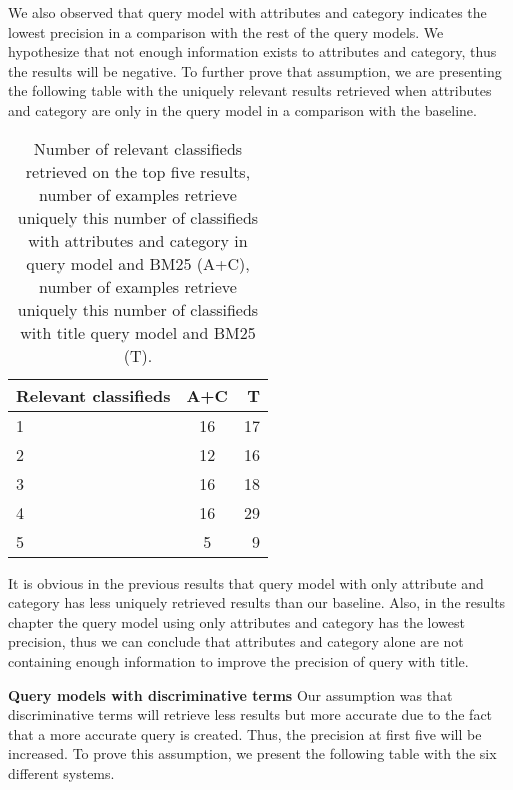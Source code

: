 We also observed that query model with attributes and category indicates the lowest precision in a comparison with the rest of the query models. We hypothesize that not enough information exists to attributes and category, thus the results will be negative. To further prove that assumption, we are presenting the following table with the uniquely relevant results retrieved when attributes and category are only in the query model in a comparison with the baseline.


\begin{table}[h]
\begin{center}
\caption{Number of relevant classifieds retrieved on the top five results, number of examples retrieve uniquely this number of classifieds with attributes and category in query model and BM25 (A+C), number of examples retrieve uniquely this number of classifieds with title query model and BM25 (T).}
\begin{tabular}{lcr}
\midrule
Relevant classifieds &  A+C & T \\
\midrule
	1 & 16 & 17 \\
	2 & 12  & 16 \\
	3 & 16 & 18 \\
	4 & 16 & 29 \\
	5 & 5 & 9 \\
\bottomrule
\end{tabular}
\end{center}
\end{table}



It is obvious in the previous results that query model with only attribute and category has less uniquely retrieved results than our baseline. Also, in the results chapter the query model using only attributes and category has the lowest precision, thus we can conclude that attributes and category alone are not containing enough information to improve the precision of query with title.


 \textbf{Query models with discriminative terms}
Our assumption was that discriminative terms will retrieve less results but more accurate due to the fact that a more accurate query is created. Thus, the precision at first five will be increased. To prove this assumption, we present the following table with the six different systems.


